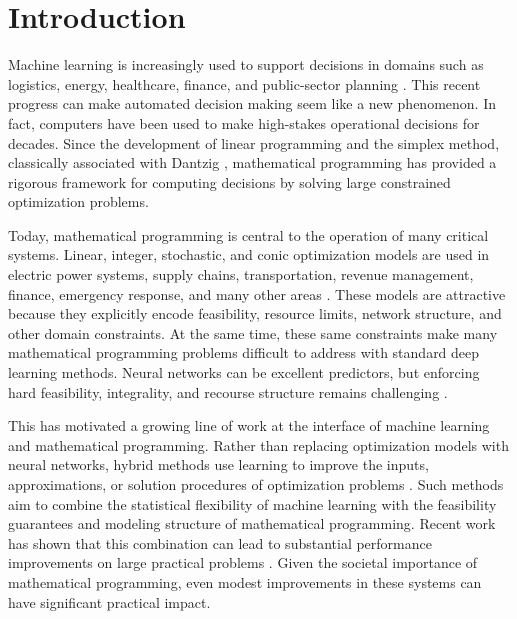 \section{Introduction}
\label{sec:introduction}

Machine learning is increasingly used to support decisions in domains such as logistics, energy, healthcare, finance, and public-sector planning \citep{placeholder_ml_decision_making}. This recent progress can make automated decision making seem like a new phenomenon. In fact, computers have been used to make high-stakes operational decisions for decades. Since the development of linear programming and the simplex method, classically associated with Dantzig \citep{placeholder_dantzig_linear_programming}, mathematical programming has provided a rigorous framework for computing decisions by solving large constrained optimization problems.

Today, mathematical programming is central to the operation of many critical systems. Linear, integer, stochastic, and conic optimization models are used in electric power systems, supply chains, transportation, revenue management, finance, emergency response, and many other areas \citep{placeholder_energy_optimization,placeholder_supply_chain_optimization,placeholder_transportation_optimization,placeholder_finance_optimization,placeholder_healthcare_optimization}. These models are attractive because they explicitly encode feasibility, resource limits, network structure, and other domain constraints. At the same time, these same constraints make many mathematical programming problems difficult to address with standard deep learning methods. Neural networks can be excellent predictors, but enforcing hard feasibility, integrality, and recourse structure remains challenging \citep{placeholder_ml_constraints,placeholder_learning_constrained_decisions}.

This has motivated a growing line of work at the interface of machine learning and mathematical programming. Rather than replacing optimization models with neural networks, hybrid methods use learning to improve the inputs, approximations, or solution procedures of optimization problems \citep{placeholder_ml_for_optimization_survey}. Such methods aim to combine the statistical flexibility of machine learning with the feasibility guarantees and modeling structure of mathematical programming. Recent work has shown that this combination can lead to substantial performance improvements on large practical problems \citep{placeholder_bouvier_real_life_optimization,placeholder_hybrid_optimization_applications}. Given the societal importance of mathematical programming, even modest improvements in these systems can have significant practical impact.


